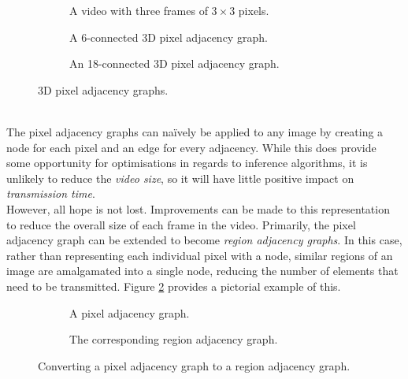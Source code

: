 \begin{figure}[htp]
    \centering
    \begin{subfigure}[b]{0.29\textwidth}
        \centering
        \captionsetup{justification=centering}
        \scalebox{1}{}
        \caption{A video with three frames of $3 \times 3$ pixels.}
    \end{subfigure} \hfill%
    \begin{subfigure}[b]{0.29\textwidth}
        \centering
        \captionsetup{justification=centering}
        \scalebox{0.5}{}
        \caption{A 6-connected 3D pixel adjacency graph.}
    \end{subfigure} \hfill%
    \begin{subfigure}[b]{0.29\textwidth}
        \centering
        \captionsetup{justification=centering}
        \scalebox{0.5}{}
        \caption{An 18-connected 3D pixel adjacency graph.}
    \end{subfigure}%
    \caption[3D Pixel Adjacency Graphs]{3D pixel adjacency graphs.}
    \label{fig:3dAdjacency}
\end{figure}
\smallskip \\ \indent
The pixel adjacency graphs can na\"ively be applied to any image by creating a node for each pixel and an edge for every adjacency. While this does provide some opportunity for optimisations in regards to inference algorithms, it is unlikely to reduce the \textit{video size}, so it will have little positive impact on \textit{transmission time}.
\smallskip \\ \indent
However, all hope is not lost. Improvements can be made to this representation to reduce the overall size of each frame in the video. Primarily, the pixel adjacency graph can be extended to become \textit{region adjacency graphs}. In this case, rather than representing each individual pixel with a node, similar regions of an image are amalgamated into a single node, reducing the number of elements that need to be transmitted. Figure \ref{fig:pixelToRegion} provides a pictorial example of this.
\begin{figure}[htp]
    \centering
    \begin{subfigure}[b]{0.45\textwidth}
        \centering
        \captionsetup{justification=centering}
        \scalebox{0.5}{}
        \caption{A pixel adjacency graph.}
    \end{subfigure}
    \begin{subfigure}[b]{0.45\textwidth}
        \centering
        \captionsetup{justification=centering}
        \scalebox{0.5}{}
        \caption{The corresponding region adjacency graph.}
    \end{subfigure}
    \caption[Pixel to Region Conversion]{Converting a pixel adjacency graph to a region adjacency graph.}
    \label{fig:pixelToRegion}
\end{figure}
